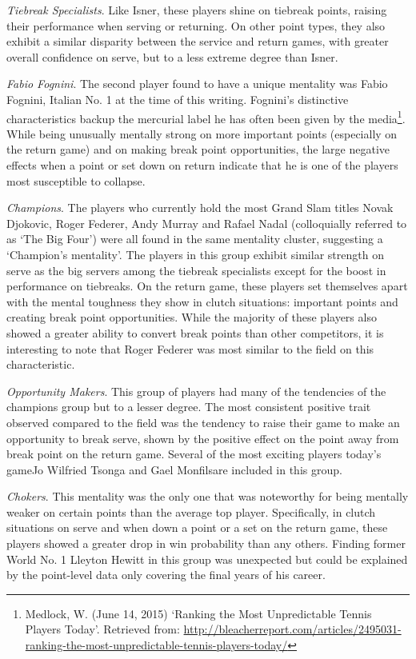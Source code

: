 \documentclass{Latex/svjour3}
\begin{document}
\textit{Tiebreak Specialists}. Like Isner, these players shine on
tiebreak points, raising their performance when serving or
returning. On other point types, they also exhibit a similar disparity
between the service and return games, with greater overall confidence
on serve, but to a less extreme degree than Isner.

\textit{Fabio Fognini}. The second player found to have a unique
mentality was Fabio Fognini, Italian No. 1 at the time of this
writing. Fognini's distinctive characteristics backup the mercurial
label he has often been given by the media\footnote{Medlock,
  W. (June 14, 2015) `Ranking the Most Unpredictable Tennis Players
  Today'. Retrieved from: \url{http://bleacherreport.com/articles/2495031-ranking-the-most-unpredictable-tennis-players-today/}}. While being unusually
mentally strong on more important points (especially on the return
game) and on making break point opportunities, the large negative
effects when a point or set down on return indicate that he is one of the
players most susceptible to collapse.

\textit{Champions}. The players who currently hold the most Grand Slam
titles Novak Djokovic, Roger Federer, Andy Murray and Rafael Nadal
(colloquially referred to as `The Big Four') were all found in the
same mentality cluster, suggesting a `Champion's mentality'. The
players in this group exhibit similar strength on serve as the big servers among the
tiebreak specialists except for the boost in performance on
tiebreaks. On the return game, these players set themselves apart with
the mental toughness they show in clutch situations: important points and creating break
point opportunities. While the majority of these players also showed a
greater ability to convert break points than other competitors, it is
interesting to note that Roger Federer was most similar to the field
on this characteristic. 

\textit{Opportunity Makers}. This group of players had many of the
tendencies of the champions group but to a lesser degree. The most
consistent positive trait observed compared to the field was the
tendency to raise their game to make an opportunity to break serve,
shown by the positive effect on the point away from break point on
the return game. Several of the most exciting players today's
game\textemdash Jo Wilfried Tsonga and Gael Monfils\textemdash are
included in this group.

\textit{Chokers}. This mentality was the only one that was noteworthy for being
mentally weaker on certain points than the average top
player. Specifically, in clutch situations on serve and when down a
point or a set on the return game, these players showed a greater drop
in win probability than any others. Finding former
World No. 1 Lleyton Hewitt in this group was unexpected but could be
explained by the point-level data only covering the final years of his career.
\end{document}
